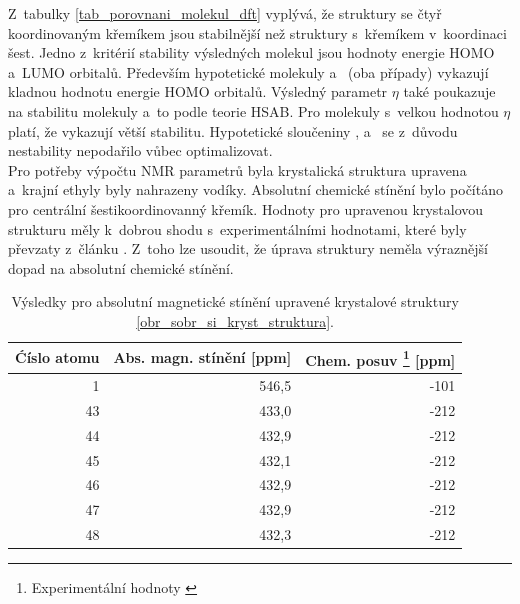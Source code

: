 \documentclass[
  printed, %
  table,   %
  lof,     %
  lot,     %
  oneside,
]{fithesis3}
\begin{document}
Z~tabulky \ref{tab_porovnani_molekul_dft} vyplývá, že struktury se čtyř koordinovaným křemíkem jsou stabilnější než struktury s~křemíkem v~koordinaci šest. Jedno z~kritérií stability výsledných molekul jsou hodnoty energie HOMO a~LUMO orbitalů. Především hypotetické molekuly  a~ (oba případy) vykazují kladnou hodnotu energie HOMO orbitalů. Výsledný parametr $\eta$ také poukazuje na stabilitu molekuly a~to podle teorie HSAB. Pro molekuly s~velkou hodnotou $\eta$ platí, že vykazují větší stabilitu. Hypotetické sloučeniny  ,  a~ se z~důvodu nestability nepodařilo vůbec optimalizovat. \\
Pro potřeby výpočtu NMR parametrů byla krystalická struktura upravena a~krajní ethyly byly nahrazeny vodíky. Absolutní chemické stínění bylo počítáno pro centrální šestikoordinovanný křemík. Hodnoty pro upravenou krystalovou strukturu měly k~dobrou shodu s~experimentálními hodnotami, které byly převzaty z~článku \cite{C3NJ00721A}. Z~toho lze usoudit, že úprava struktury neměla výraznější dopad na absolutní chemické stínění. 

\begin{table}[htbp]
\begin{minipage}{\textwidth}
\caption{Výsledky pro absolutní magnetické stínění upravené krystalové struktury \ref{obr_sobr_si_kryst_struktura}.}
\begin{center}
\begin{tabular}{|r|r|r|}
\hline
\multicolumn{1}{|l|}{Ćíslo atomu} & \multicolumn{1}{l|}{Abs. magn. stínění [ppm]} & \multicolumn{1}{l|}{Chem. posuv \footnote{Experimentální hodnoty \cite{1316862}} [ppm]} \\ \hline
1 & 546,5 & -101 \\ \hline
43 & 433,0 & -212 \\ \hline
44 & 432,9 & -212 \\ \hline
45 & 432,1 & -212 \\ \hline
46 & 432,9 & -212 \\ \hline
47 & 432,9 & -212 \\ \hline
48 & 432,3 & -212 \\ \hline
\end{tabular}
\end{center}
\label{vysledky_abs_magn_stineni}
\end{minipage}
\end{table}

  
\end{document}
